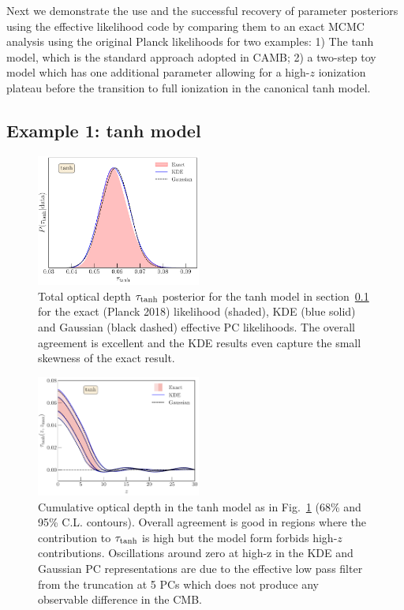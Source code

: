 \documentclass[prd,twocolumn,amsmath,amssymb,floatfix,superscriptaddress,nofootinbib]{revtex4-1}
\newcommand{\refsec}[1]{section~\ref{sec:#1}}
\begin{document}
Next we demonstrate the use and the successful recovery of parameter posteriors using the effective likelihood code by comparing them to an exact MCMC analysis using the original Planck likelihoods for two examples: 1) The tanh model, which is the standard approach adopted in CAMB; 2) a two-step toy model which has one additional parameter allowing for a high-$z$ ionization plateau before the transition to full ionization in the canonical tanh model.

\subsection{Example 1: tanh model}
\label{sec:example1}

\begin{figure}
\includegraphics[width=0.48\textwidth]
{paper/plots/pl18_tau_posterior_tanh_vs_tanh_kde_vs_tanh_gaussian_dz_auto_zre_prior_6p1_normalized_by_max.pdf}
\caption{Total optical depth $\tau_{\rm tanh}$ posterior for the tanh model in \refsec{example1} for the exact (Planck 2018) likelihood (shaded), KDE 
(blue solid) and  Gaussian (black dashed)
effective PC likelihoods. The overall agreement is excellent and the KDE results even capture the small skewness of the exact result.
}
\label{fig:tanh}

\end{figure}


\begin{figure}[ht]
\includegraphics[width=0.48\textwidth]{paper/plots/pl18_taugtz_tanh_direct_vs_kde_vs_gaussian.pdf}
\caption{Cumulative optical depth in the tanh model as in Fig.~\ref{fig:tanh}
(68\% and 95\% C.L. contours).  Overall agreement is good in regions where the contribution to $\tau_{\rm tanh}$ is high but the model form forbids high-$z$ contributions.    Oscillations around zero at high-z in the KDE and Gaussian PC representations are due to the effective low pass filter from the truncation at 5 PCs which does not produce any observable difference in the CMB. }
\label{fig:plot_taugtz_PC_vs_tanh}
\end{figure}
\end{document}
